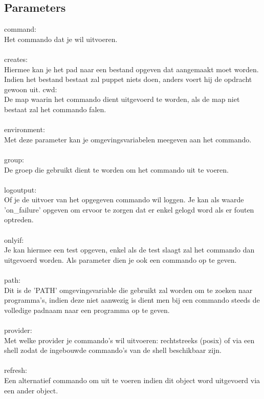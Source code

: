 \subsection{Parameters}
command:\\
Het commando dat je wil uitvoeren.\\\\
%
creates:\\
Hiermee kan je het pad naar een bestand opgeven dat aangemaakt moet worden. Indien het bestand bestaat zal puppet niets doen, anders voert hij de opdracht gewoon uit.
%
cwd:\\
De map waarin het commando dient uitgevoerd te worden, als de map niet bestaat zal het commando falen.\\\\
%
environment:\\
Met deze parameter kan je omgevingsvariabelen meegeven aan het commando.\\\\
%
group:\\
De groep die gebruikt dient te worden om het commando uit te voeren.\\\\
%
logoutput:\\
Of je de uitvoer van het opgegeven commando wil loggen. Je kan als waarde 'on\_failure' opgeven om ervoor te zorgen dat er enkel gelogd word als er fouten optreden.\\\\
%
onlyif:\\
Je kan hiermee een test opgeven, enkel als de test slaagt zal het commando dan uitgevoerd worden. Als parameter dien je ook een commando op te geven.\\\\
%
path:\\
Dit is de 'PATH' omgevingsvariable die gebruikt zal worden om te zoeken naar programma's, indien deze niet aanwezig is dient men bij een commando steeds de volledige padnaam naar een programma op te geven.\\\\
%
provider:\\
Met welke provider je commando's wil uitvoeren: rechtstreeks (posix) of via een shell zodat de ingebouwde commando's van de shell beschikbaar zijn.\\\\
%
refresh:\\
Een alternatief commando om uit te voeren indien dit object word uitgevoerd via een ander object.\\\\
